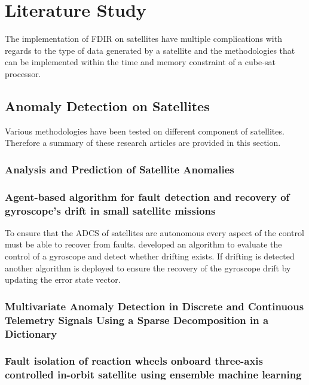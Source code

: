 \chapter{Literature Study}
\vspace{-2em}
\minitoc

The implementation of FDIR on satellites have multiple complications with regards to the type of data generated by a satellite and the methodologies that can be implemented within the time and memory constraint of a cube-sat processor.

\section{Anomaly Detection on Satellites}
Various methodologies have been tested on different component of satellites. Therefore a summary of these research articles are provided in this section.

\subsection{Analysis and Prediction of Satellite Anomalies}
\textcite{Wintoft}

\subsection{Agent-based algorithm for fault detection and recovery of gyroscope's drift in small satellite missions}
To ensure that the ADCS of satellites are autonomous every aspect of the control must be able to recover from faults. \textcite{carvajal2017agent} developed an algorithm to evaluate the control of a gyroscope and detect whether drifting exists. If drifting is detected another algorithm is deployed to ensure the recovery of the gyroscope drift by updating the error state vector.

\subsection{Multivariate Anomaly Detection in Discrete and Continuous Telemetry Signals Using a Sparse Decomposition in a Dictionary}
\cite{Pilastre2020}

\subsection{Fault isolation of reaction wheels onboard three-axis controlled in-orbit satellite using ensemble machine learning}
\cite{rahimi2020fault}

